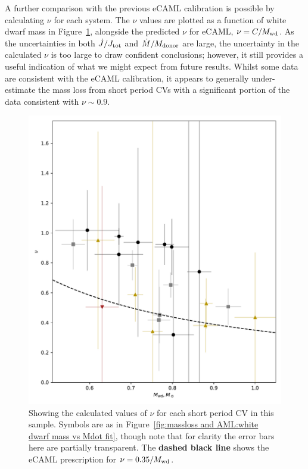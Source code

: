 A further comparison with the previous eCAML calibration is possible by calculating $\nu$ for each system.
The $\nu$ values are plotted as a function of white dwarf mass in Figure~\ref{fig:massloss and AML:calculated nu for all short period CVs}, alongside the predicted $\nu$ for eCAML, $\nu = C / M_{\rm wd}$.
As the uncertainties in both $\dot J/J_{\rm tot}$ and $\dot M / M_{\rm donor}$ are large, the uncertainty in the calculated $\nu$ is too large to draw confident conclusions; however, it still provides a useful indication of what we might expect from future results.
Whilst some data are consistent with the \citet{Schreiber2016} eCAML calibration, it appears to generally under-estimate the mass loss from short period CVs with a significant portion of the data consistent with $\nu \sim 0.9$.
\begin{figure}
    \centering
    \includegraphics[width=\textwidth]{figures/results/Mdot/nu_for_each_system.pdf}
    \caption{Showing the calculated values of $\nu$ for each short period CV in this sample. Symbols are as in Figure~\ref{fig:massloss and AML:white dwarf mass vs Mdot fit}, though note that for clarity the error bars here are partially transparent. The {\bf dashed black line} shows the eCAML prescription for $\nu = 0.35 / M_{\rm wd}$.}
    \label{fig:massloss and AML:calculated nu for all short period CVs}
\end{figure}



